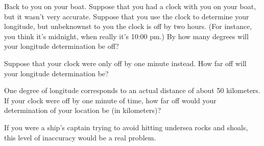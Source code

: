 \vskip 1in

Back to you on your boat. Suppose that you had a clock with you
on your boat, but it wasn't very accurate. Suppose that you use the clock
to determine your longitude, but unbeknownst to you the clock is off by
two hours. (For instance, you think it's midnight, when really it's 10:00
pm.) By how many degrees will your longitude determination be off?

\vskip 1in

Suppose that your clock were only off by one minute instead. How far
off will your longitude determination be?

\vskip 1in

One degree of longitude corresponds to an actual distance of about 50 
kilometers. If your clock were off by one minute of time, 
how far off would your determination of your location be (in kilometers)?

\vskip 1in

If you were a ship's captain 
trying to avoid hitting undersea rocks
and shoals, this level of inaccuracy would be a real problem.

